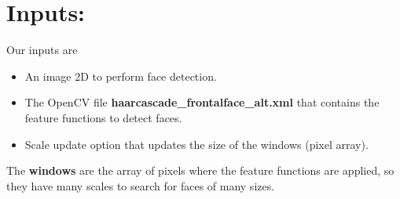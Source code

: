 \section{Inputs:}
Our inputs are 
\begin{itemize}
	\item An image 2D to perform face detection.
	\item The OpenCV file \textbf{haarcascade\_frontalface\_alt.xml} that contains the feature functions to detect faces.
	\item Scale update option that updates the size of the windows (pixel array).
\end{itemize}
The \textbf{windows} are the array of pixels where the feature functions are applied, so they have many scales to search for faces of many sizes.